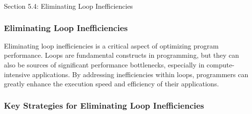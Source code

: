 \begin{notes}{Section 5.4: Eliminating Loop Inefficiencies}
    \subsubsection*{Eliminating Loop Inefficiencies}

    Eliminating loop inefficiencies is a critical aspect of optimizing program performance. Loops are fundamental constructs in programming, but they can also be sources of significant performance 
    bottlenecks, especially in compute-intensive applications. By addressing inefficiencies within loops, programmers can greatly enhance the execution speed and efficiency of their applications. \vspace*{1em}    
    \subsubsection*{Key Strategies for Eliminating Loop Inefficiencies}
    

\end{notes}
